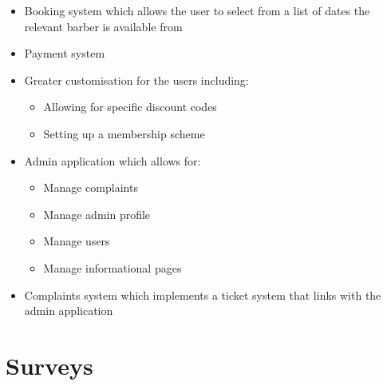 \documentclass[12pt]{article}
\begin{document}
	\begin{itemize}
		\item Booking system which allows the user to select from a list of dates the relevant barber is available from
		\item Payment system
		\item Greater customisation for the users including:
		\begin{itemize}
			\item Allowing for specific discount codes
			\item Setting up a membership scheme
		\end{itemize}
		\item Admin application which allows for:
		\begin{itemize}
			\item Manage complaints
			\item Manage admin profile
			\item Manage users
			\item Manage informational pages
		\end{itemize}
		\item Complaints system which implements a ticket system that links with the admin application
	\end{itemize}

	
	
	\pagebreak
	\printbibliography
	\pagebreak
	
	\appendix
	\appendixpage
	
	\section{Surveys}
	\label{appendix-surveys}
	
\end{document}
